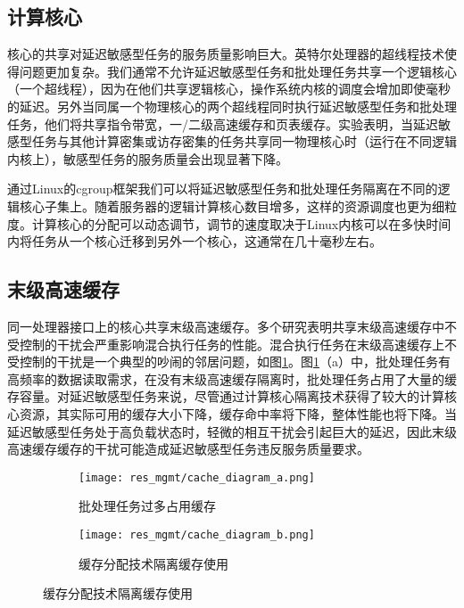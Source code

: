 \subsection{计算核心}
核心的共享对延迟敏感型任务的服务质量影响巨大\cite{lo2015heracles}。英特尔处理器的超线程技术使得问题更加复杂。我们通常不允许延迟敏感型任务和批处理任务共享一个逻辑核心（一个超线程），因为在他们共享逻辑核心，操作系统内核的调度会增加即使毫秒的延迟\cite{leverich2014reconciling}。另外当同属一个物理核心的两个超线程同时执行延迟敏感型任务和批处理任务，他们将共享指令带宽，一/二级高速缓存和页表缓存。实验表明，当延迟敏感型任务与其他计算密集或访存密集的任务共享同一物理核心时（运行在不同逻辑内核上），敏感型任务的服务质量会出现显著下降\cite{lo2015heracles}。

通过Linux的cgroup框架\cite{menage2008cgroups}我们可以将延迟敏感型任务和批处理任务隔离在不同的逻辑核心子集上。随着服务器的逻辑计算核心数目增多，这样的资源调度也更为细粒度。计算核心的分配可以动态调节，调节的速度取决于Linux内核可以在多快时间内将任务从一个核心迁移到另外一个核心，这通常在几十毫秒左右。

\subsection{末级高速缓存}
同一处理器接口上的核心共享末级高速缓存。多个研究表明共享末级高速缓存中不受控制的干扰会严重影响混合执行任务的性能\cite{delimitrou2014quasar}\cite{govindan2011cuanta}\cite{leverich2014reconciling}\cite{mars2012increasing}\cite{sanchez2011vantage}。混合执行任务在末级高速缓存上不受控制的干扰是一个典型的吵闹的邻居问题，如图\ref{fig:cache_diagram}。图\ref{fig:cache_diagram}（a）中，批处理任务有高频率的数据读取需求，在没有末级高速缓存隔离时，批处理任务占用了大量的缓存容量。对延迟敏感型任务来说，尽管通过计算核心隔离技术获得了较大的计算核心资源，其实际可用的缓存大小下降，缓存命中率将下降，整体性能也将下降。当延迟敏感型任务处于高负载状态时，轻微的相互干扰会引起巨大的延迟\cite{kasture2014ubik}，因此末级高速缓存缓存的干扰可能造成延迟敏感型任务违反服务质量要求。

\begin{figure}
  \centering
  \begin{subfigure}{0.4\textwidth}
    \centering
    \texttt{[image: res\_mgmt/cache\_diagram\_a.png]}
    \caption{批处理任务过多占用缓存}
  \end{subfigure}
  \hspace{3em}
  \begin{subfigure}{0.4\textwidth}
    \centering
    \texttt{[image: res\_mgmt/cache\_diagram\_b.png]}
    \caption{缓存分配技术隔离缓存使用}
  \end{subfigure}
  \label{fig:cache_diagram}
\end{figure}


